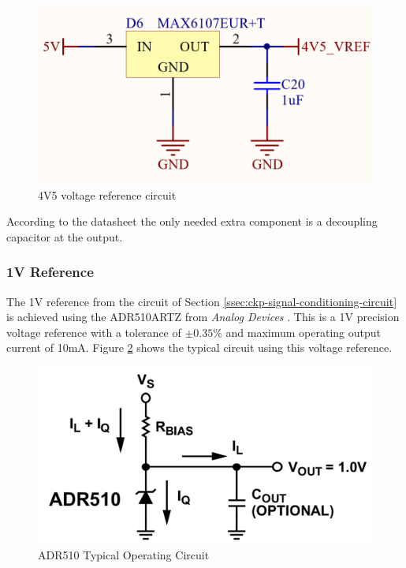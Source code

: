 			\begin{figure}[htbp]
				\centering
					\includegraphics[scale=1.1]{figuras/fig-max6107-circuit.png}
				\caption{4V5 voltage reference circuit \cite{max6107-circuit-circuit}}
				\label{fig:max6107-circuit-circuit}
			\end{figure}

			According to the datasheet the only needed extra component is a decoupling capacitor at the output.

		\subsubsection{1V Reference}\label{sssec:1v-reference}

			The 1V reference from the circuit of Section \ref{ssec:ckp-signal-conditioning-circuit} is achieved using the ADR510ARTZ from \textit{Analog Devices} \cite{adr510artz-datasheet}. This is a 1V precision voltage reference with a tolerance of $\pm 0.35\%$ and maximum operating output current of 10mA. Figure \ref{fig:adr510-typical-circuit} shows the typical circuit using this voltage reference.

			\begin{figure}[htbp]
				\centering
					\includegraphics[scale=0.5]{figuras/fig-adr510-typical-circuit.png}
				\caption{ADR510 Typical Operating Circuit \cite{adr510-typical-circuit}}
				\label{fig:adr510-typical-circuit}
			\end{figure}


